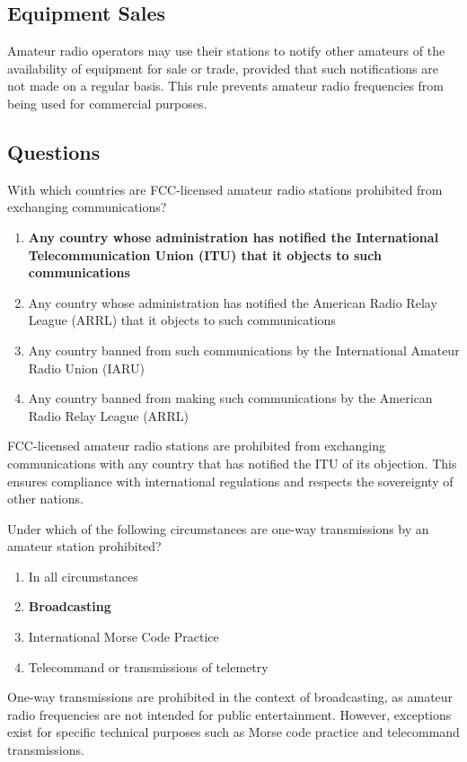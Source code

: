 \subsection*{Equipment Sales}
Amateur radio operators may use their stations to notify other amateurs of the availability of equipment for sale or trade, provided that such notifications are not made on a regular basis. This rule prevents amateur radio frequencies from being used for commercial purposes.

\subsection*{Questions}
\begin{tcolorbox}[colback=gray!10!white,colframe=black!75!black,title={T1D01}]
With which countries are FCC-licensed amateur radio stations prohibited from exchanging communications?
\begin{enumerate}[label=\Alph*,noitemsep]
    \item \textbf{Any country whose administration has notified the International Telecommunication Union (ITU) that it objects to such communications}
    \item Any country whose administration has notified the American Radio Relay League (ARRL) that it objects to such communications
    \item Any country banned from such communications by the International Amateur Radio Union (IARU)
    \item Any country banned from making such communications by the American Radio Relay League (ARRL)
\end{enumerate}
\end{tcolorbox}
FCC-licensed amateur radio stations are prohibited from exchanging communications with any country that has notified the ITU of its objection. This ensures compliance with international regulations and respects the sovereignty of other nations.


\begin{tcolorbox}[colback=gray!10!white,colframe=black!75!black,title={T1D02}]
Under which of the following circumstances are one-way transmissions by an amateur station prohibited?
\begin{enumerate}[label=\Alph*,noitemsep]
    \item In all circumstances
    \item \textbf{Broadcasting}
    \item International Morse Code Practice
    \item Telecommand or transmissions of telemetry
\end{enumerate}
\end{tcolorbox}
One-way transmissions are prohibited in the context of broadcasting, as amateur radio frequencies are not intended for public entertainment. However, exceptions exist for specific technical purposes such as Morse code practice and telecommand transmissions.

